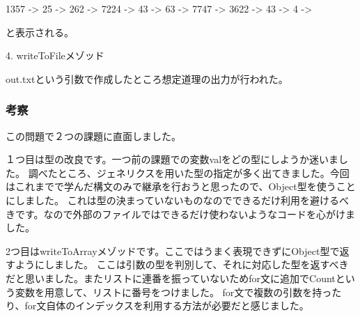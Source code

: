 \documentclass[10.5pt,a4paper]{jsarticle}
\begin{document}
1357 -> 25 -> 262 -> 7224 -> 43 -> 63
-> 7747 -> 3622 -> 43 -> 4 -> 

と表示される。

4. writeToFileメゾッド

out.txtという引数で作成したところ想定道理の出力が行われた。

\subsubsection{考察}

この問題で２つの課題に直面しました。

１つ目は型の改良です。一つ前の課題での変数valをどの型にしようか迷いました。
調べたところ、ジェネリクスを用いた型の指定が多く出てきました。今回はこれまでで学んだ構文のみで継承を行おうと思ったので、Object型を使うことにしました。
これは型の決まっていないものなのでできるだけ利用を避けるべきです。なので外部のファイルではできるだけ使わないようなコードを心がけました。

2つ目はwriteToArrayメゾッドです。ここではうまく表現できずにObject型で返すようにしました。
ここは引数の型を判別して、それに対応した型を返すべきだと思いました。またリストに連番を振っていないためfor文に追加でCountという変数を用意して、リストに番号をつけました。
for文で複数の引数を持ったり、for文自体のインデックスを利用する方法が必要だと感じました。
\end{document}
